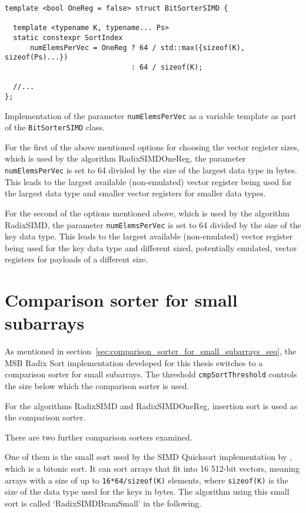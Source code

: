 \documentclass[12pt, a4paper, openright, twoside]{tiarbeit}
\begin{document}
\begin{listing}[h!]
  \begin{verbatim}
template <bool OneReg = false> struct BitSorterSIMD {

  template <typename K, typename... Ps>
  static constexpr SortIndex
      numElemsPerVec = OneReg ? 64 / std::max({sizeof(K), sizeof(Ps)...})
                              : 64 / sizeof(K);

  //...
};
  \end{verbatim}
  \caption{Implementation of the parameter \texttt{numElemsPerVec} as a variable template
    as part of the \texttt{BitSorterSIMD} class.}
  \label{lst:numElemsPerVec_impl}
\end{listing}

For the first of the above mentioned options for choosing the vector register
sizes, which is used by the algorithm RadixSIMDOneReg, the parameter
\texttt{numElemsPerVec} is set to 64 divided by the size of the largest
data type in bytes. This leads to the largest available (non-emulated)
vector register being used for the largest data type and smaller
vector registers for smaller data types.

For the second of the options mentioned above, which is used by the
algorithm RadixSIMD, the parameter \texttt{numElemsPerVec} is set to
64 divided by the size of the key data type. This leads to the largest
available (non-emulated) vector register being used for the key data type
and different sized, potentially emulated, vector registers for payloads
of a different size.

\section{Comparison sorter for small subarrays}
\label{sec:comparision_sorter_small_subarrays_simd}

As mentioned in section~\ref{sec:comparison_sorter_for_small_subarrays_seq},
the MSB Radix Sort implementation developed for this thesis
switches to a comparison sorter for small subarrays.
The threshold \texttt{cmpSortThreshold} controls the size below
which the comparison sorter is used.

For the algorithms RadixSIMD and RadixSIMDOneReg, insertion sort is
used as the comparison sorter.

There are two further comparison sorters examined.

One of them is the small sort used by the SIMD Quicksort
implementation by \citet{bramas}, which is a bitonic sort.
It can sort arrays that fit into 16 512-bit vectors,
meaning arrays with a size of up to \texttt{16*64/sizeof(K)}
elements, where \texttt{sizeof(K)} is the size of the data type
used for the keys in bytes.
The algorithm using this small sort is called `RadixSIMDBramSmall' in
the following.
\end{document}

